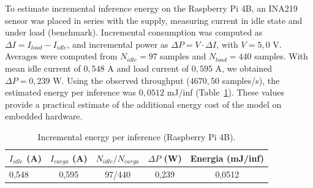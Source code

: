To estimate incremental inference energy on the Raspberry Pi 4B, an INA219 sensor was placed in
series with the supply, measuring current in idle state and under load (benchmark). Incremental
consumption was computed as $\Delta I = I_{load} - I_{idle}$, and incremental power as
$\Delta P = V \cdot \Delta I$, with $V=5{,}0$ V. Averages were computed from $N_{idle}=97$
samples and $N_{load}=440$ samples. With mean idle current of $0{,}548$ A and load current of
$0{,}595$ A, we obtained $\Delta P = 0{,}239$ W. Using the observed throughput
($4670{,}50$ samples/s), the estimated energy per inference was $0{,}0512$ mJ/inf
(Table~\ref{tab:energy_rpi}). These values provide a practical estimate of the additional energy
cost of the model on embedded hardware.

\begin{table}[ht!]
\centering
\caption{Incremental energy per inference (Raspberry Pi 4B).}
\begin{tabular}{lcccc}
\toprule
$I_{idle}$ (A) & $I_{carga}$ (A) & $N_{idle}/N_{carga}$ & $\Delta P$ (W) & Energia (mJ/inf) \\
\midrule
0{,}548 & 0{,}595 & 97/440 & 0{,}239 & 0{,}0512 \\
\bottomrule
\end{tabular}\label{tab:energy_rpi}
\end{table}
